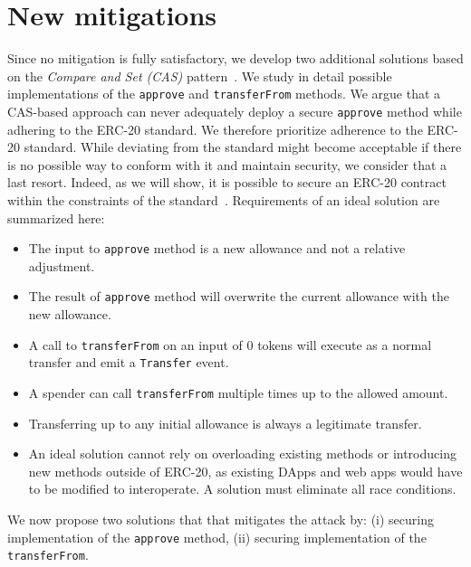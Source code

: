 \section{New mitigations}
Since no mitigation is fully satisfactory, we develop two additional solutions based on the \textit{Compare and Set (CAS)} pattern~\cite{CompareSwap}. We study in detail possible implementations of the \texttt{approve} and \texttt{transferFrom} methods. We argue that a CAS-based approach can never adequately deploy a secure \texttt{approve} method while adhering to the ERC-20 standard. We therefore prioritize adherence to the ERC-20 standard. While deviating from the standard might become acceptable if there is no possible way to conform with it and maintain security, we consider that a last resort. Indeed, as we will show, it is possible to secure an ERC-20 contract within the constraints of the standard~\cite{Interface}. Requirements of an ideal solution are summarized here:
\begin{itemize}
	\item The input to \texttt{approve} method is a new allowance and not a relative adjustment.
	\item The result of \texttt{approve} method will overwrite the current allowance with the new allowance.
	\item A call to \texttt{transferFrom} on an input of 0 tokens will execute as a normal transfer and emit a \texttt{Transfer} event.
	\item A spender can call \texttt{transferFrom} multiple times up to the allowed amount.
	\item Transferring up to any initial allowance is always a legitimate transfer.
	\item An ideal solution cannot rely on overloading existing methods or introducing new methods outside of ERC-20, as existing DApps and web apps would have to be modified to interoperate. A solution must eliminate all race conditions.
\end{itemize}
We now propose two solutions that that mitigates the attack by: (i) securing implementation of the \texttt{approve} method, (ii) securing implementation of the \texttt{transferFrom}.

